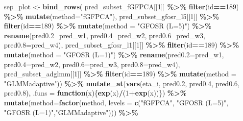 \documentclass[
]{article}
\newenvironment{Shaded}{\begin{snugshade}}{\end{snugshade}}
\newcommand{\AttributeTok}[1]{\textcolor[rgb]{0.13,0.29,0.53}{#1}}
\newcommand{\ControlFlowTok}[1]{\textcolor[rgb]{0.13,0.29,0.53}{\textbf{#1}}}
\newcommand{\DecValTok}[1]{\textcolor[rgb]{0.00,0.00,0.81}{#1}}
\newcommand{\FloatTok}[1]{\textcolor[rgb]{0.00,0.00,0.81}{#1}}
\newcommand{\FunctionTok}[1]{\textcolor[rgb]{0.13,0.29,0.53}{\textbf{#1}}}
\newcommand{\NormalTok}[1]{#1}
\newcommand{\OtherTok}[1]{\textcolor[rgb]{0.56,0.35,0.01}{#1}}
\newcommand{\SpecialCharTok}[1]{\textcolor[rgb]{0.81,0.36,0.00}{\textbf{#1}}}
\newcommand{\StringTok}[1]{\textcolor[rgb]{0.31,0.60,0.02}{#1}}
\begin{document}
\begin{Shaded}
\begin{Highlighting}[]
\NormalTok{sep\_plot }\OtherTok{\textless{}{-}} \FunctionTok{bind\_rows}\NormalTok{(}
\NormalTok{  pred\_subset\_fGFPCA[[}\DecValTok{1}\NormalTok{]] }\SpecialCharTok{\%\textgreater{}\%} \FunctionTok{filter}\NormalTok{(id}\SpecialCharTok{==}\DecValTok{189}\NormalTok{) }\SpecialCharTok{\%\textgreater{}\%} \FunctionTok{mutate}\NormalTok{(}\AttributeTok{method=}\StringTok{"fGFPCA"}\NormalTok{),}
\NormalTok{  pred\_subset\_gfosr\_l5[[}\DecValTok{1}\NormalTok{]] }\SpecialCharTok{\%\textgreater{}\%} \FunctionTok{filter}\NormalTok{(id}\SpecialCharTok{==}\DecValTok{189}\NormalTok{) }\SpecialCharTok{\%\textgreater{}\%} \FunctionTok{mutate}\NormalTok{(}\AttributeTok{method =} \StringTok{"GFOSR (L=5)"}\NormalTok{) }\SpecialCharTok{\%\textgreater{}\%} 
    \FunctionTok{rename}\NormalTok{(}\AttributeTok{pred0.2=}\NormalTok{pred\_w1, }\AttributeTok{pred0.4=}\NormalTok{pred\_w2, }\AttributeTok{pred0.6=}\NormalTok{pred\_w3, }\AttributeTok{pred0.8=}\NormalTok{pred\_w4),}
\NormalTok{  pred\_subset\_gfosr\_l1[[}\DecValTok{1}\NormalTok{]] }\SpecialCharTok{\%\textgreater{}\%} \FunctionTok{filter}\NormalTok{(id}\SpecialCharTok{==}\DecValTok{189}\NormalTok{) }\SpecialCharTok{\%\textgreater{}\%} \FunctionTok{mutate}\NormalTok{(}\AttributeTok{method =} \StringTok{"GFOSR (L=1)"}\NormalTok{) }\SpecialCharTok{\%\textgreater{}\%}
    \FunctionTok{rename}\NormalTok{(}\AttributeTok{pred0.2=}\NormalTok{pred\_w1, }\AttributeTok{pred0.4=}\NormalTok{pred\_w2, }\AttributeTok{pred0.6=}\NormalTok{pred\_w3, }\AttributeTok{pred0.8=}\NormalTok{pred\_w4),}
\NormalTok{  pred\_subset\_adglmm[[}\DecValTok{1}\NormalTok{]] }\SpecialCharTok{\%\textgreater{}\%} \FunctionTok{filter}\NormalTok{(id}\SpecialCharTok{==}\DecValTok{189}\NormalTok{) }\SpecialCharTok{\%\textgreater{}\%} \FunctionTok{mutate}\NormalTok{(}\AttributeTok{method =} \StringTok{"GLMMadaptive"}\NormalTok{)) }\SpecialCharTok{\%\textgreater{}\%}
  \FunctionTok{mutate\_at}\NormalTok{(}\FunctionTok{vars}\NormalTok{(eta\_i, pred0}\FloatTok{.2}\NormalTok{, pred0}\FloatTok{.4}\NormalTok{, pred0}\FloatTok{.6}\NormalTok{, pred0}\FloatTok{.8}\NormalTok{), }
                \AttributeTok{.funs =} \ControlFlowTok{function}\NormalTok{(x)\{}\FunctionTok{exp}\NormalTok{(x)}\SpecialCharTok{/}\NormalTok{(}\DecValTok{1}\SpecialCharTok{+}\FunctionTok{exp}\NormalTok{(x))\}) }\SpecialCharTok{\%\textgreater{}\%}
  \FunctionTok{mutate}\NormalTok{(}\AttributeTok{method=}\FunctionTok{factor}\NormalTok{(method, }
         \AttributeTok{levels =} \FunctionTok{c}\NormalTok{(}\StringTok{"fGFPCA"}\NormalTok{, }\StringTok{"GFOSR (L=5)"}\NormalTok{, }\StringTok{"GFOSR (L=1)"}\NormalTok{,}\StringTok{"GLMMadaptive"}\NormalTok{))) }\SpecialCharTok{\%\textgreater{}\%}

\end{Highlighting}
\end{Shaded}
\end{document}
